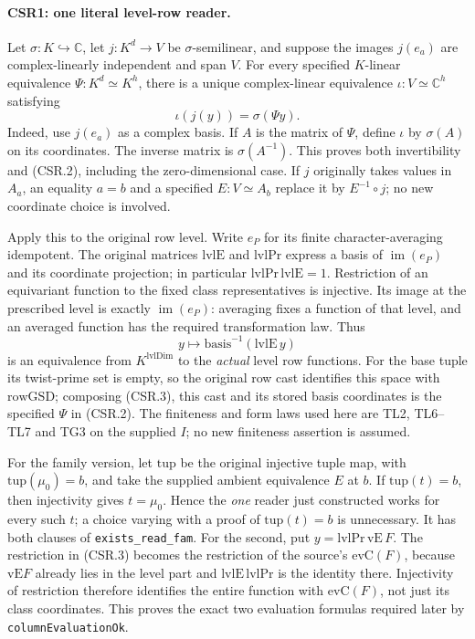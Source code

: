\paragraph{CSR1: one literal level-row reader.}\label{claim:CSR1}
Let \(\sigma:K\hookrightarrow\mathbb C\), let
\(j:K^d\to V\) be \(\sigma\)-semilinear, and suppose the images
\(j(e_a)\) are complex-linearly independent and span \(V\).
For every specified \(K\)-linear equivalence
\(\Psi:K^d\simeq K^h\), there is a unique complex-linear equivalence
\(\iota:V\simeq\mathbb C^h\) satisfying
\[
                  \iota(j(y))=\sigma(\Psi y).
 \tag{CSR.2}
\]
Indeed, use \(j(e_a)\) as a complex basis. If \(A\) is the matrix of
\(\Psi\), define \(\iota\) by \(\sigma(A)\) on its coordinates.
The inverse matrix is \(\sigma(A^{-1})\). This proves both
invertibility and (CSR.2), including the zero-dimensional case.
If \(j\) originally takes values in \(A_a\), an equality \(a=b\)
and a specified \(E:V\simeq A_b\) replace it by
\(E^{-1}\circ j\); no new coordinate choice is involved.

Apply this to the original row level. Write \(e_P\) for its finite
character-averaging idempotent. The original matrices
\(\mathrm{lvlE}\) and \(\mathrm{lvlPr}\) express a basis of
\(\operatorname{im}(e_P)\) and its coordinate projection; in particular
\(\mathrm{lvlPr}\,\mathrm{lvlE}=1\). Restriction of an equivariant
function to the fixed class representatives is injective. Its image
at the prescribed level is exactly \(\operatorname{im}(e_P)\):
averaging fixes a function of that level, and an averaged function
has the required transformation law. Thus
\[
 y\longmapsto
 \mathrm{basis}^{-1}(\mathrm{lvlE}\,y)
 \tag{CSR.3}
\]
is an equivalence from \(K^{\mathrm{lvlDim}}\) to the \emph{actual}
level row functions. For the base tuple its twist-prime set is empty,
so the original row cast identifies this space with
\(\mathrm{rowGSD}\); composing (CSR.3), this cast and its stored
basis coordinates is the specified \(\Psi\) in (CSR.2).
The finiteness and form laws used here are TL2, TL6--TL7 and TG3
on the supplied \(I\); no new finiteness assertion is assumed.

For the family version, let \(\mathrm{tup}\) be the original injective
tuple map, with \(\mathrm{tup}(\mu_0)=b\), and take the supplied
ambient equivalence \(E\) at \(b\). If \(\mathrm{tup}(t)=b\), then
injectivity gives \(t=\mu_0\). Hence the \emph{one} reader just
constructed works for every such \(t\); a choice varying with a
proof of \(\mathrm{tup}(t)=b\) is unnecessary.
It has both clauses of \texttt{exists\_read\_fam}. For the second,
put \(y=\mathrm{lvlPr}\,\mathrm{vE}\,F\). The restriction in
(CSR.3) becomes the restriction of the source's \(\mathrm{evC}(F)\),
because \(\mathrm{vE}F\) already lies in the level part and
\(\mathrm{lvlE}\,\mathrm{lvlPr}\) is the identity there.
Injectivity of restriction therefore identifies the entire function
with \(\mathrm{evC}(F)\), not just its class coordinates.
This proves the exact two evaluation formulas required later by
\texttt{columnEvaluationOk}.

